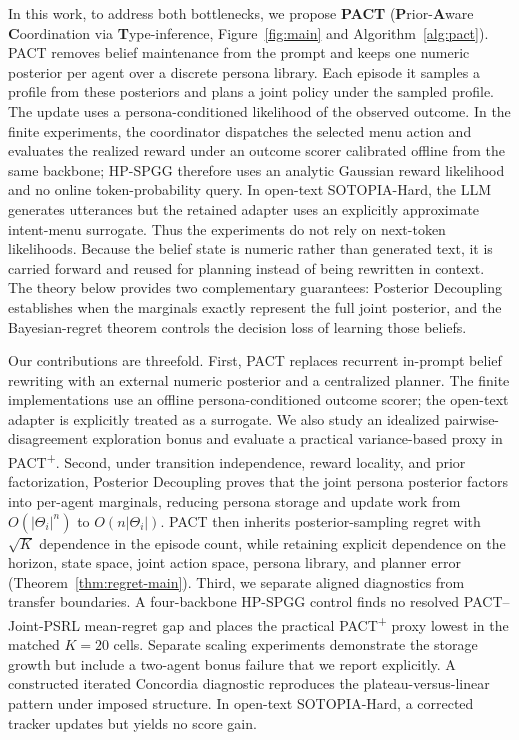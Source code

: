\documentclass[letterpaper]{article} %
\begin{document}
In this work, to address both bottlenecks, we propose \textbf{PACT} (\textbf{P}rior-\textbf{A}ware \textbf{C}oordination via \textbf{T}ype-inference, Figure~\ref{fig:main} and Algorithm~\ref{alg:pact}). PACT removes belief maintenance from the prompt and keeps one numeric posterior per agent over a discrete persona library. Each episode it samples a profile from these posteriors and plans a joint policy under the sampled profile. The update uses a persona-conditioned likelihood of the observed outcome. In the finite experiments, the coordinator dispatches the selected menu action and evaluates the realized reward under an outcome scorer calibrated offline from the same backbone; HP-SPGG therefore uses an analytic Gaussian reward likelihood and no online token-probability query. In open-text SOTOPIA-Hard, the LLM generates utterances but the retained adapter uses an explicitly approximate intent-menu surrogate. Thus the experiments do not rely on next-token likelihoods. Because the belief state is numeric rather than generated text, it is carried forward and reused for planning instead of being rewritten in context. The theory below provides two complementary guarantees: Posterior Decoupling establishes when the marginals exactly represent the full joint posterior, and the Bayesian-regret theorem controls the decision loss of learning those beliefs.

Our contributions are threefold. First, PACT replaces recurrent in-prompt belief rewriting with an external numeric posterior and a centralized planner. The finite implementations use an offline persona-conditioned outcome scorer; the open-text adapter is explicitly treated as a surrogate. We also study an idealized pairwise-disagreement exploration bonus and evaluate a practical variance-based proxy in PACT\textsuperscript{+}. Second, under transition independence, reward locality, and prior factorization, Posterior Decoupling proves that the joint persona posterior factors into per-agent marginals, reducing persona storage and update work from $O(|\Theta_i|^n)$ to $O(n|\Theta_i|)$. PACT then inherits posterior-sampling regret with $\sqrt K$ dependence in the episode count, while retaining explicit dependence on the horizon, state space, joint action space, persona library, and planner error (Theorem~\ref{thm:regret-main}). Third, we separate aligned diagnostics from transfer boundaries. A four-backbone HP-SPGG control finds no resolved PACT--Joint-PSRL mean-regret gap and places the practical PACT\textsuperscript{+} proxy lowest in the matched $K{=}20$ cells. Separate scaling experiments demonstrate the storage growth but include a two-agent bonus failure that we report explicitly. A constructed iterated Concordia diagnostic reproduces the plateau-versus-linear pattern under imposed structure. In open-text SOTOPIA-Hard, a corrected tracker updates but yields no score gain.
\end{document}
